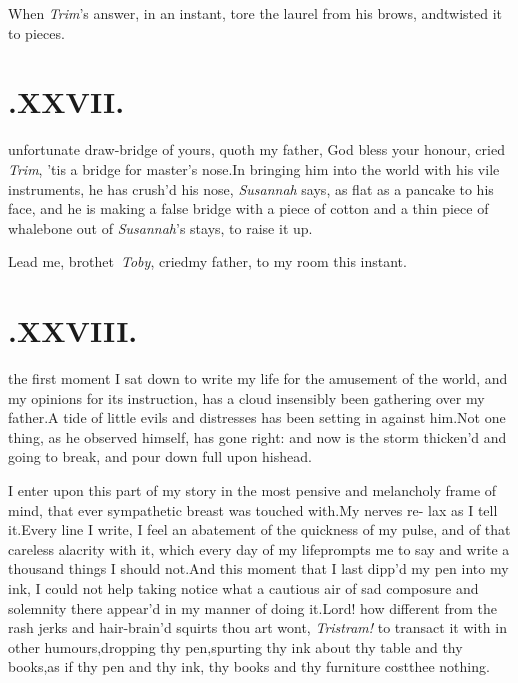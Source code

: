 \documentclass{article}
\begin{document}
When \textit{Trim}’s answer, in an instant, tore the laurel from
his brows, and\break twisted it to pieces.


\null
\section{.\quad  XXVII.}

 unfortunate draw-bridge\break
of yours, quoth my father,\tsk\break
God bless your honour, cried \textit{Trim}, ’tis a bridge for
master’s nose.\tsh In bring\-ing him into the world with his vile
instruments, he has crush’d his nose, \textit{Su\-sannah} says, as
flat as a pancake to his face, and he is making a false bridge
with a piece of cotton and a thin piece of whalebone out of
\textit{Susannah}’s stays, to raise it up.

\tsh Lead me, brothet\sic\ \textit{Toby}, cried\break my father, to
my room this instant.

\baselineskip
{}\newpage

\null
\section{.\quad  XXVIII.}

 the first moment I sat down\break
to write my life for the amusement of the world, and my opinions
for its instruction, has a cloud insensibly been gathering over
my father.\tsh A tide of little evils and distresses has been
setting in against him.\tsk Not one thing, as he observed
himself, has gone right: and now is the storm thicken’d and
going to break, and pour down full upon his\break head.

I enter upon this part of my story in the most pensive and
melancholy frame of mind, that ever sympathetic breast\break
was touched with.\tsh My nerves re-\break
lax as I tell it.\tsh Every line I write,\break
I feel an abatement of the quickness of
my pulse, and of that careless alacrity with it, which every day
of my life\break prompts me to say and write a thousand things I
should not.\tsh And this moment that I last dipp’d my pen into
my ink, I could not help taking notice what a cautious air of
sad composure and solemnity there appear’d in my manner of doing
it.\tsh Lord! how different from the rash jerks and hair-brain’d
squirts thou art wont, \textit{Tristram!} to transact it with in
other humours,\tsk dropping thy pen,\tsk spurting thy ink about
thy table and thy books,\tsh as if thy pen and thy ink, thy
books and thy furniture cost\break thee nothing.
\end{document}
